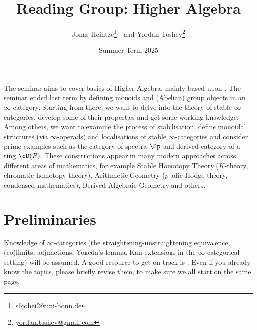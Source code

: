 \documentclass{article}
\title{\vspace{-45pt}Reading Group: Higher Algebra}
\author{Jonas Heintze\thanks{\href{mailto:s6johei2@uni-bonn.de}{
      \url{s6johei2@uni-bonn.de}}}~~and 
  Yordan Toshev\thanks{\href{mailto:yordan.toshev@uni-bonn.de}{
\url{yordan.toshev@gmail.com}}}}
\date{Summer Term 2025}
\begin{document}
\maketitle




The seminar aims to cover basics of Higher Algebra, mainly based
upon \cite[Chapter II]{K-ThrNotes}.
The seminar ended last term by defining monoids and 
(Abelian) group objects in an $\infty$-category.
Starting from there, we want to delve into the
theory of stable $\infty$-categories, develop some
of their properties and get some working knowledge.
Among others, we want to examine the process of
stabilisation, define monoidal structures (via $\infty$-operads) 
and localisations 
of stable $\infty$-categories and consider prime examples such as
the category of spectra $\Sp$ and derived category of a 
ring $\cD(R)$.
These constructions appear in many modern approaches across different areas of 
mathematics,
for example
Stable Homotopy Theory ($K$-theory, chromatic homotopy theory),
Arithmetic Geometry ($p$-adic Hodge theory, condensed mathematics),
Derived Algebraic Geometry and others.


\section*{Preliminaries}
Knowledge of $\infty$-categories
(the straightening-unstraightening equivalence, (co)limits,
adjunctions, Yoneda's lemma, Kan extensions in the $\infty$-categorical
setting) will be assumed.
A good resource to get on track is \cite[Chapters 1-6]{infty-CatNotes}.
Even if you already know the topics, please briefly revise them,
to make sure we all start on the same page.
\end{document}
